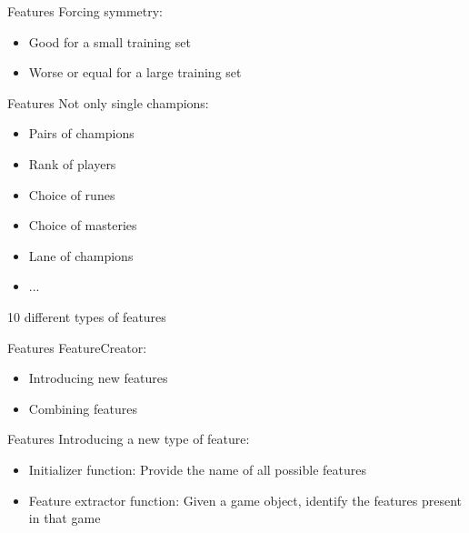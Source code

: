 \begin{frame}{Features}
\centering
Forcing symmetry:
\begin{itemize}
\item Good for a small training set
\item Worse or equal for a large training set
\end{itemize}
\end{frame}

\begin{frame}{Features}
\centering
Not only single champions:
\begin{itemize}
\item Pairs of champions
\item Rank of players
\item Choice of runes
\item Choice of masteries
\item Lane of champions
\item ...
\end{itemize}

10 different types of features
\end{frame}


\begin{frame}{Features}
\centering
FeatureCreator:
\begin{itemize}
\item Introducing new features
\item Combining features
\end{itemize}
\end{frame}

\begin{frame}{Features}
Introducing a new type of feature:
\begin{itemize}
\item Initializer function: Provide the name of all possible features
\item Feature extractor function: Given a game object, identify the features present in that game
\end{itemize}
\end{frame}

